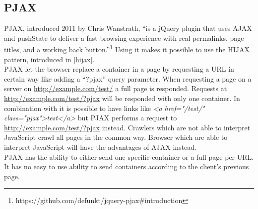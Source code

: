 \subsection{PJAX\label{pjax}}
PJAX, introduced 2011 by Chris Wanstrath, \enquote{is a jQuery plugin that uses AJAX and pushState to deliver a fast browsing experience with real permalinks, page titles, and a working back button.}\footnote{https://github.com/defunkt/jquery-pjax\#introduction}
Using it makes it possible to use the HIJAX pattern, introduced in \ref{hijax}.
\\
PJAX let the browser replace a container in a page by requesting a URL in certain way like adding a \enquote{?pjax} query parameter.
When requesting a page on a server on \url{http://example.com/test/} a full page is responded.
Requests at \url{http://example.com/test/?pjax} will be responded with only one container.
In combination with \hijax{} it is possible to have links like \emph{<a href="/test/" class="pjax">test</a>} but PJAX performs a request to \url{http://example.com/test/?pjax} instead.
Crawlers which are not able to interpret JavaScript crawl all pages in the common way.
Browser which are able to interpret JavaScript will have the advantages of AJAX instead.
\\
PJAX has the ability to either send one specific container or a full page per URL. It has no easy to use ability to send containers according to the client's previous page.
